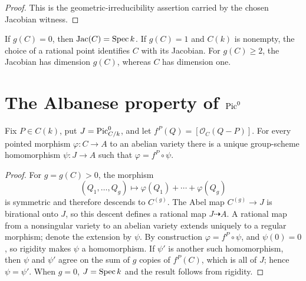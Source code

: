 \begin{proof}
  This is the geometric-irreducibility assertion carried by the chosen
  Jacobian witness.
\end{proof}

\begin{remark}
  If \(g(C)=0\), then \(\mathrm{Jac}(C)=\operatorname{Spec} k\).  If \(g(C)=1\) and \(C(k)\) is
  nonempty, the choice of a rational point identifies \(C\) with its
  Jacobian.  For \(g(C)\geq2\), the Jacobian has dimension \(g(C)\), whereas
  \(C\) has dimension one.
\end{remark}

\section{The Albanese property of \(\operatorname{Pic}^0\)}
\label{mk-sec:Jacobian_routeA4_albaneseUP}

\begin{theorem}
  \label{mk-thm:albanese_universal_property_northstar}
  Fix \(P\in C(k)\), put \(J=\operatorname{Pic}^0_{C/k}\), and let
  \(f^P(Q)=[\mathcal O_C(Q-P)]\).  For every pointed morphism
  \(\varphi\colon C\to A\) to an abelian variety there is a unique
  group-scheme homomorphism \(\psi\colon J\to A\) such that
  \(\varphi=f^P\circ\psi\).
\end{theorem}

\begin{proof}
  For \(g=g(C)>0\), the morphism
  \[
    (Q_1,\ldots,Q_g)\longmapsto
      \varphi(Q_1)+\cdots+\varphi(Q_g)
  \]
  is symmetric and therefore descends to \(C^{(g)}\).  The Abel map
  \(C^{(g)}\to J\) is birational onto \(J\), so this descent defines a
  rational map \(J\dashrightarrow A\).  A rational map from a nonsingular
  variety to an abelian variety extends uniquely to a regular morphism;
  denote the extension by \(\psi\).  By construction
  \(\varphi=f^P\circ\psi\), and \(\psi(0)=0\), so rigidity makes \(\psi\) a
  homomorphism.  If \(\psi'\) is another such homomorphism, then \(\psi\) and
  \(\psi'\) agree on the sum of \(g\) copies of \(f^P(C)\), which is all of
  \(J\); hence \(\psi=\psi'\).  When \(g=0\), \(J=\operatorname{Spec} k\) and the result
  follows from rigidity.
\end{proof}
